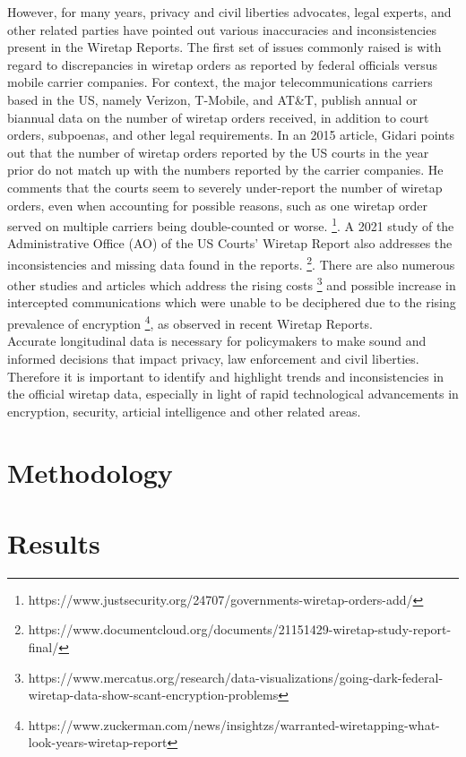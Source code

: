 \documentclass[11pt,twocolumn]{article} %
\begin{document}
\noindent However, for many years, privacy and civil liberties advocates, legal experts, and other related parties have pointed out various inaccuracies and inconsistencies present in the Wiretap Reports. The first set of issues commonly raised is with regard to discrepancies in wiretap orders as reported by federal officials versus mobile carrier companies. For context, the major telecommunications carriers based in the US, namely Verizon, T-Mobile, and AT\&T, publish annual or biannual data on the number of wiretap orders received, in addition to court orders, subpoenas, and other legal requirements. In an 2015 article, Gidari points out that the number of wiretap orders reported by the US courts in the year prior do not match up with the numbers reported by the carrier companies. He comments that the courts seem to severely under-report the number of wiretap orders, even when accounting for possible reasons, such as one wiretap order served on multiple carriers being double-counted or worse. \footnote{https://www.justsecurity.org/24707/governments-wiretap-orders-add/}. A 2021 study of the Administrative Office (AO) of the US Courts' Wiretap Report also addresses the inconsistencies and missing data found in the reports. \footnote{https://www.documentcloud.org/documents/21151429-wiretap-study-report-final/}. There are also numerous other studies and articles which address the rising costs \footnote{https://www.mercatus.org/research/data-visualizations/going-dark-federal-wiretap-data-show-scant-encryption-problems} and possible increase in intercepted communications which were unable to be deciphered due to the rising prevalence of encryption \footnote{https://www.zuckerman.com/news/insightzs/warranted-wiretapping-what-look-years-wiretap-report}, as observed in recent Wiretap Reports.\\

\noindent Accurate longitudinal data is necessary for policymakers to make sound and informed decisions that impact privacy, law enforcement and civil liberties. Therefore it is important to identify and highlight trends and inconsistencies in the official wiretap data, especially in light of rapid technological advancements in encryption, security, articial intelligence and other related areas.

\section{Methodology}

\section{Results}
\end{document}
